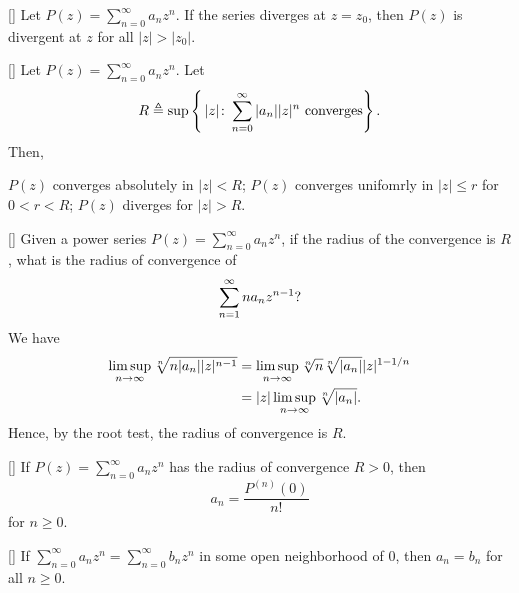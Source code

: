 \documentclass[../complex_variables_1.tex]{subfiles}
\begin{document}
\begin{Corollary}{}[]
    Let \(P(z) = \sum_{n=0}^\infty a_nz^n\).
    If the series diverges at \(z = z_0\), then \(P(z)\) is divergent at \(z\) for all \(|z| > |z_0|\).
\end{Corollary}

\begin{Corollary}{}[]
    Let \(P(z) = \sum_{n=0}^\infty a_nz^n\).
    Let
    \[
        R \triangleq \sup \left\{\,|z| \colon \sum_{n=0}^\infty |a_n| |z|^n\text{ converges} \right\}\text.
    \]
    Then,
    \begin{enumerate}[label=(\roman*)]
        \ii \(P(z)\) converges absolutely in \(|z| < R\);
        \ii \(P(z)\) converges unifomrly in \(|z| \le r\) for \(0 < r < R\);
        \ii \(P(z)\) diverges for \(|z| > R\).
    \end{enumerate}
\end{Corollary}

\begin{Example}{}[]
    Given a power series \(P(z) = \sum_{n=0}^\infty a_nz^n\),
    if the radius of the convergence is \(R\), what is the radius of convergence of
    \[
        \sum_{n=1}^\infty na_nz^{n-1}\text?
    \]
    We have
    \begin{align*}
        \limsup_{n\to\infty}\sqrt[n]{n|a_n||z|^{n-1}}
        &= \limsup_{n \to \infty} \sqrt[n]{n}\sqrt[n]{|a_n|}|z|^{1-1/n} \\
        &= |z| \limsup_{n \to \infty}\sqrt[n]{|a_n|}\text.
    \end{align*}
    Hence, by the root test, the radius of convergence is \(R\).
\end{Example}

\begin{Corollary}{}[]
    If \(P(z) = \sum_{n=0}^\infty a_nz^n\) has the radius of convergence \(R > 0\),
    then
    \[
        a_n = \frac{P^{(n)}(0)}{n!}
    \]
    for \(n \ge 0\).
\end{Corollary}

\begin{Corollary}{}[]
    If \(\sum_{n=0}^\infty a_nz^n = \sum_{n=0}^\infty b_nz^n\) in some open neighborhood of \(0\),
    then \(a_n = b_n\) for all \(n \ge 0\).
\end{Corollary}
\end{document}
